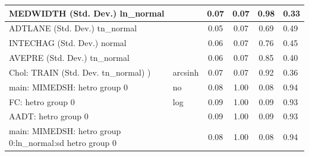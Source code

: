 \begin{table}
\begin{center}
\begin{tabular}{|l|l|c|c|c|l|}
			\hline
			MEDWIDTH (Std. Dev.) ln_normal &  & 0.07 & 0.07 & 0.98 & 0.33 \\
			\hline
			ADTLANE (Std. Dev.) tn_normal &  & 0.05 & 0.07 & 0.69 & 0.49 \\
			\hline
			INTECHAG (Std. Dev.) normal &  & 0.06 & 0.07 & 0.76 & 0.45 \\
			\hline
			AVEPRE (Std. Dev.) tn_normal &  & 0.06 & 0.07 & 0.85 & 0.40 \\
			\hline
			 Chol: TRAIN (Std. Dev. tn_normal) ) & arcsinh & 0.07 & 0.07 & 0.92 & 0.36 \\
			\hline
			main: MIMEDSH: hetro group 0 & no & 0.08 & 1.00 & 0.08 & 0.94 \\
			\hline
			FC: hetro group 0 & log & 0.09 & 1.00 & 0.09 & 0.93 \\
			\hline
			AADT: hetro group 0 &  & 0.09 & 1.00 & 0.09 & 0.93 \\
			\hline
			main: MIMEDSH: hetro group 0:ln_normal:sd  hetro group 0 &  & 0.08 & 1.00 & 0.08 & 0.94 \\
			\hline
		\end{tabular}
	\end{center}
\end{table}
